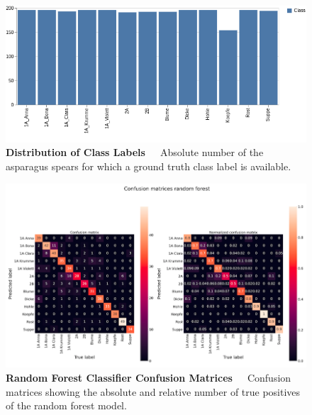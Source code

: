 \begin{figure}[!htb]
	\centering
	\includegraphics[scale=0.55]{Figures/chapter04/ftl_visualization.png}
	\decoRule
	\caption[Distribution of Class Labels]{\textbf{Distribution of Class Labels}~~~Absolute number of the asparagus spears for which a ground truth class label is available.}
	\label{fig:FeatureToLabelVisualization}
\end{figure}

\begin{figure}[!htb]
	\centering
	\includegraphics[scale=0.4]{Figures/chapter04/ftl_confusion_recall_random_forest.png}
	\decoRule
	\caption[Random Forest Classifier Confusion Matrices]{\textbf{Random Forest Classifier Confusion Matrices}~~~Confusion matrices showing the absolute and relative number of true positives of the random forest model.}
	\label{fig:FeatureToLabelRandomForest}
\end{figure}


